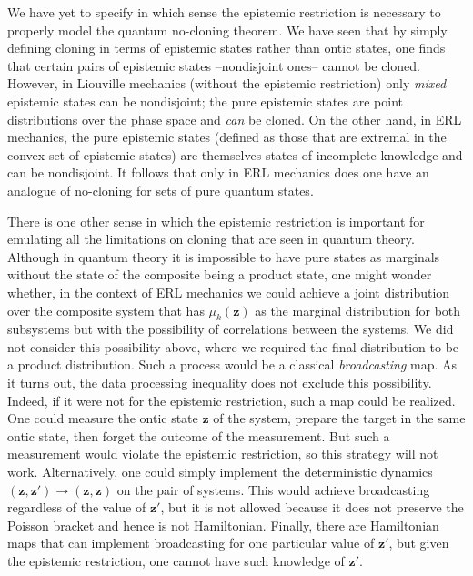 \documentclass[pra,superscriptaddress,nofootinbib,12pt]{revtex4-2}
\begin{document}
We have yet to specify in which sense the epistemic restriction is necessary to properly model the quantum no-cloning theorem. We have seen that by simply defining cloning in terms of epistemic states rather than ontic states, one finds that certain pairs of epistemic states --nondisjoint ones-- cannot be cloned.  However, in Liouville mechanics (without the epistemic restriction) only \emph{mixed} epistemic states can be nondisjoint; the pure epistemic states are point distributions over the phase space and \emph{can} be cloned.  On the other hand, in ERL mechanics, the pure epistemic states (defined as those that are extremal in the convex set of epistemic states) are themselves states of incomplete knowledge and can be nondisjoint. It follows that only in ERL mechanics does one have an analogue of no-cloning for sets of pure quantum states.

There is one other sense in which the epistemic restriction is important for emulating all the limitations on cloning that are seen in quantum theory. Although in quantum theory it is impossible to have pure states as marginals without the state of the composite being a product state, one might wonder whether, in the context of ERL mechanics we could achieve a joint distribution over the composite system that has $\mu_{k}(\mathbf{z})$ as the marginal distribution for both subsystems but with the possibility of correlations between the systems.  We did not consider this possibility above, where we required the final distribution to be a product distribution.  Such a process would be a classical \emph{broadcasting} map.  As it turns out, the data processing inequality does not exclude this possibility.  Indeed, if it were not for the epistemic restriction, such a map could be realized.  One could measure the ontic state $\mathbf{z}$ of the system, prepare the target in the same ontic state, then forget the outcome of the measurement.  But such a measurement would violate the epistemic restriction, so this strategy will not work. Alternatively, one could simply implement the deterministic dynamics $(\mathbf{z},\mathbf{z'}) \to (\mathbf{z},\mathbf{z})$ on the pair of systems. This would achieve broadcasting regardless of the value of $\mathbf{z'}$, but it is not allowed because it does not preserve the Poisson bracket and hence is not Hamiltonian. Finally, there are Hamiltonian maps that can implement broadcasting for one particular value of $\mathbf{z'}$, but given the epistemic restriction, one cannot have such knowledge of $\mathbf{z'}$.
\end{document}
